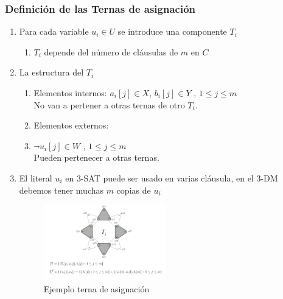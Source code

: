 \documentclass{article}
\begin{document}
\subsubsection{Definición de las Ternas de asignación}
\begin{enumerate}
    \item Para cada variable $u_i \in U$ se introduce una componente $T_i$
     \begin{enumerate}
        \item $T_i$ depende del número de cláusulas de $m$ en $C$
        
     \end{enumerate}
     \item La estructura del $T_i$
     \begin{enumerate}
        \item Elementos internos:
        $a_i[j]\in X$,  $b_i[j] \in Y$ , $1 \leq j \leq m$ \\
        No van a pertener a otras ternas de otro $T_i$.
        \item Elementos externos:
        \item $\lnot u_i[j] \in W$ ,  $1 \leq j \leq m$\\
        Pueden pertenecer a otras ternas.

     \end{enumerate}
     \item El literal $u_i$ en 3-SAT puede ser usado en varias cláusula, en el 3-DM debemos tener muchas $m$ copias de $u_i$
     \begin{figure}[H]
        \centering
        \includegraphics[width=0.5\textwidth]{photos/ejemplo_terna_asignacion.png}
        \caption{Ejemplo terna de asignación}
        \label{fig:etiqueta}


    \end{figure}
    

\end{enumerate}
\end{document}
